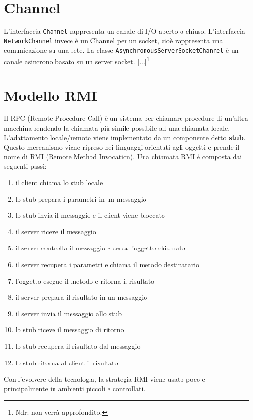 \section{Channel}
L'interfaccia \texttt{Channel} rappresenta un canale di I/O aperto o chiuso. L'interfaccia \texttt{NetworkChannel} invece è un Channel per un socket, cioè rappresenta una comunicazione su una rete. 
La classe \texttt{AsynchronousServerSocketChannel} è un canale asincrono basato su un server socket. [...]\footnote{Ndr: non verrà approfondito.}

\section{Modello RMI}
Il RPC (Remote Procedure Call) è un sistema per chiamare procedure di un'altra macchina rendendo la chiamata più simile possibile ad una chiamata locale. L'adattamento locale/remoto viene implementato da un componente detto \textbf{stub}. Questo meccanismo viene ripreso nei linguaggi orientati agli oggetti e prende il nome di RMI (Remote Method Invocation). Una chiamata RMI è composta dai seguenti passi:
\begin{enumerate}
\item il client chiama lo stub locale
\item lo stub prepara i parametri in un messaggio
\item lo stub invia il messaggio e il client viene bloccato
\item il server riceve il messaggio
\item il server controlla il messaggio e cerca l'oggetto chiamato
\item il server recupera i parametri e chiama il metodo destinatario
\item l'oggetto esegue il metodo e ritorna il risultato
\item il server prepara il risultato in un messaggio
\item il server invia il messaggio allo stub
\item lo stub riceve il messaggio di ritorno
\item lo stub recupera il risultato dal messaggio
\item lo stub ritorna al client il risultato
\end{enumerate}
Con l'evolvere della tecnologia, la strategia RMI viene usato poco e principalmente in ambienti piccoli e controllati.
